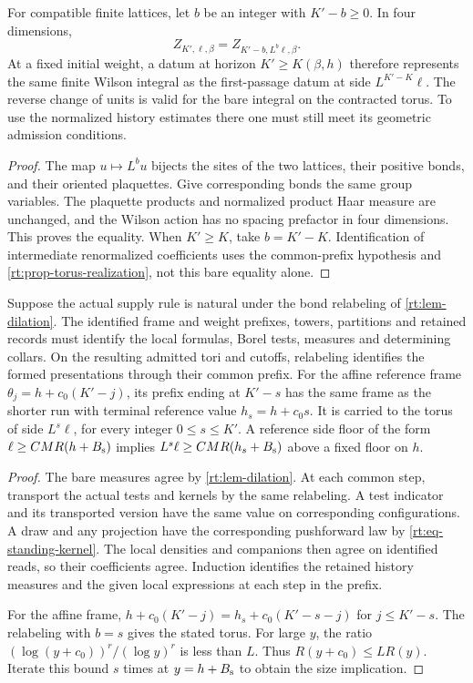 \documentclass[11pt,letterpaper,reqno]{amsart}
\makeatletter
\numberwithin{equation}{section}
\theoremstyle{definition}
\newcommand{\ms@minorstart}{%
  \pushQED{\qed}\renewcommand{\qedsymbol}{$\blacksquare$}}
\newenvironment{proposition}[1][]{\ms@minorstart\ms@proposition[#1]}
  {\popQED\endms@proposition}
\newenvironment{lemma}[1][]{\ms@minorstart\ms@lemma[#1]}
  {\popQED\endms@lemma}
\theoremstyle{remark}
\makeatother
\begin{document}
\begin{lemma}[Change of lattice units]\label{rt:lem-dilation}
For compatible finite lattices, let \(b\) be an integer with
\(K'-b\ge0\). In four dimensions,
\[
       Z_{K',\ell,\beta}=Z_{K'-b,L^b\ell,\beta}.
\]
At a fixed initial weight, a datum at horizon \(K'\ge K(\beta,h)\)
therefore represents the same finite Wilson integral as the
first-passage datum at side \(L^{K'-K}\ell\). The reverse change
of units is valid for the bare integral on the contracted torus.
To use the normalized history estimates there one must still
meet its geometric admission conditions.
\end{lemma}
\begin{proof}
The map \(u\mapsto L^b u\) bijects the sites of the two lattices,
their positive bonds, and their oriented plaquettes. Give
corresponding bonds the same group variables. The plaquette
products and normalized product Haar measure are unchanged,
and the Wilson action has no spacing prefactor in four
dimensions. This proves the equality. When \(K'\ge K\), take
\(b=K'-K\). Identification of intermediate renormalized
coefficients uses the common-prefix hypothesis and
\cref{rt:prop-torus-realization}, not this bare equality alone.
\end{proof}

\begin{proposition}[Common prefixes under change of units]
\label{rt:prop-common-prefix-units}
Suppose the actual supply rule is natural under the bond
relabeling of \cref{rt:lem-dilation}. The identified frame
and weight prefixes, towers, partitions and retained records
must identify the local formulas, Borel tests, measures and
determining collars. On the resulting admitted tori and
cutoffs, relabeling identifies the formed presentations
through their common prefix. For the affine reference frame
\(\theta_j=h+c_0(K'-j)\), its prefix ending at \(K'-s\) has
the same frame as the shorter run with terminal reference
value \(h_s=h+c_0s\). It is carried to the torus of side
\(L^s\ell\), for every integer \(0\le s\le K'\). A reference
side floor of the form \(\ell\ge C M R(h+B_{\rm s})\)
implies \(L^s\ell\ge C M R(h_s+B_{\rm s})\) above a fixed
floor on \(h\).
\end{proposition}
\begin{proof}
The bare measures agree by \cref{rt:lem-dilation}. At each
common step, transport the actual tests and kernels by the
same relabeling. A test indicator and its transported version
have the same value on corresponding configurations. A
draw and any projection have the corresponding pushforward
law by \cref{rt:eq-standing-kernel}. The local densities and
companions then agree on identified reads, so their coefficients
agree. Induction identifies the retained history measures
and the given local expressions at each step in the prefix.

For the affine frame,
\(h+c_0(K'-j)=h_s+c_0(K'-s-j)\) for \(j\le K'-s\).
The relabeling with \(b=s\) gives the stated torus.
For large \(y\), the ratio
\((\log(y+c_0))^r/(\log y)^r\) is less than \(L\).
Thus \(R(y+c_0)\le L R(y)\). Iterate this bound \(s\)
times at \(y=h+B_{\rm s}\) to obtain the size implication.
\end{proof}
\end{document}
